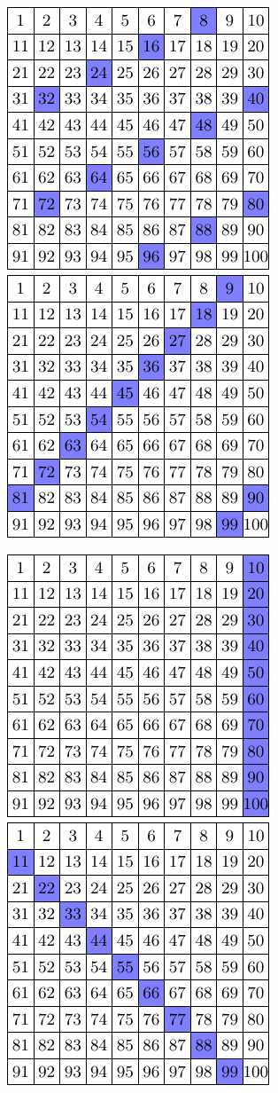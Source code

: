 \begin{center}
	\includegraphics{8} \qquad \qquad
	\includegraphics{9}
\end{center}
\begin{center}
	\includegraphics{10} \qquad \qquad
	\includegraphics{11}
\end{center}
